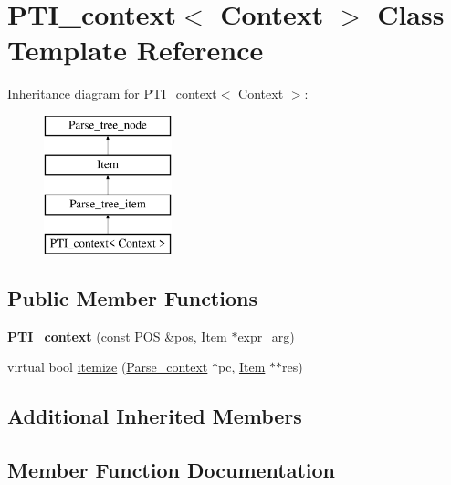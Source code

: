 \hypertarget{classPTI__context}{}\section{P\+T\+I\+\_\+context$<$ Context $>$ Class Template Reference}
\label{classPTI__context}
Inheritance diagram for P\+T\+I\+\_\+context$<$ Context $>$\+:\begin{figure}[H]
\begin{center}
\leavevmode
\includegraphics[height=4.000000cm]{classPTI__context}
\end{center}
\end{figure}
\subsection*{Public Member Functions}
\begin{DoxyCompactItemize}
\item 
\mbox{\label{classPTI__context_abc2ea8a93bcf27315a496268178b8f5d}} 
{\bfseries P\+T\+I\+\_\+context} (const \mbox{\hyperlink{structYYLTYPE}{P\+OS}} \&pos, \mbox{\hyperlink{classItem}{Item}} $\ast$expr\+\_\+arg)
\item 
virtual bool \mbox{\hyperlink{classPTI__context_a8b09b3195bb1ec82c471a686d0f17bbb}{itemize}} (\mbox{\hyperlink{structParse__context}{Parse\+\_\+context}} $\ast$pc, \mbox{\hyperlink{classItem}{Item}} $\ast$$\ast$res)
\end{DoxyCompactItemize}
\subsection*{Additional Inherited Members}


\subsection{Member Function Documentation}
\mbox{\label{classPTI__context_a8b09b3195bb1ec82c471a686d0f17bbb}} 
